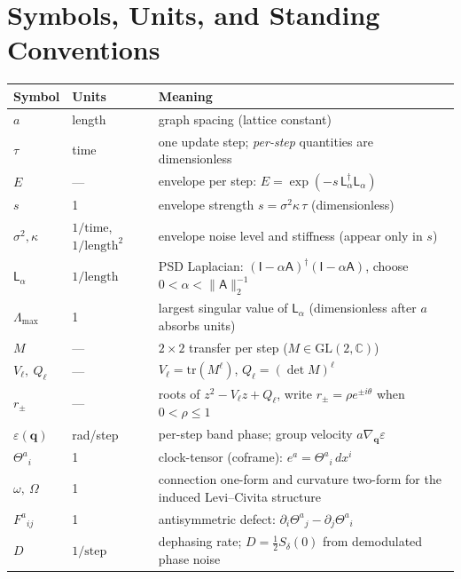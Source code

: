 \documentclass[11pt]{article}
\newcommand{\Id}{\mathsf{I}}
\newcommand{\Adj}{\mathsf{A}}
\newcommand{\Lap}{\mathsf{L}_\alpha}
\newcommand{\M}{M}
\newcommand{\Vl}{V_\ell}
\newcommand{\Qell}{Q^\ell}
\newcommand{\Thet}{\Theta}
\renewcommand{\Qell}{Q_\ell}
\begin{document}
\section{Symbols, Units, and Standing Conventions}
\begin{center}
\begin{tabular}{@{}llp{8.1cm}@{}}
\toprule
Symbol & Units & Meaning \\
\midrule
$a$ & length & graph spacing (lattice constant) \\
$\tau$ & time & one update step; \emph{per-step} quantities are dimensionless \\
$E$ & --- & envelope per step: $E=\exp(-s\,\Lap^\dagger\Lap)$ \\
$s$ & 1 & envelope strength $s=\sigma^2\kappa\,\tau$ (dimensionless) \\
$\sigma^2,\kappa$ & $1/\text{time}$, $1/\text{length}^2$ & envelope noise level and stiffness (appear only in $s$) \\
$\Lap$ & $1/\text{length}$ & PSD Laplacian: $(\Id-\alpha\Adj)^\dagger(\Id-\alpha\Adj)$, choose $0<\alpha<\|\Adj\|_2^{-1}$ \\
$\Lambda_{\max}$ & 1 & largest singular value of $\Lap$ (dimensionless after $a$ absorbs units) \\
$\M$ & --- & $2\times 2$ transfer per step ($\M\in\mathrm{GL}(2,\mathbb C)$) \\
$V_\ell,\ Q_\ell$ & --- & $V_\ell=\mathrm{tr}(\M^\ell)$, $Q_\ell=(\det\M)^\ell$ \\
$r_\pm$ & --- & roots of $z^2-\Vl z+\Qell$, write $r_\pm=\rho e^{\pm i\theta}$ when $0<\rho\le1$ \\
$\varepsilon(\mathbf q)$ & rad/step & per-step band phase; group velocity $a\nabla_{\mathbf q}\varepsilon$ \\
$\Thet^a{}_i$ & 1 & clock-tensor (coframe): $e^a=\Thet^a{}_i\,dx^i$ \\
$\omega,\ \Omega$ & 1 & connection one-form and curvature two-form for the induced Levi--Civita structure \\
$F^a{}_{ij}$ & 1 & antisymmetric defect: $\partial_i\Thet^a{}_j-\partial_j\Thet^a{}_i$ \\
$D$ & $1/\text{step}$ & dephasing rate; $D=\tfrac12 S_\delta(0)$ from demodulated phase noise \\
\bottomrule
\end{tabular}
\end{center}
\end{document}
